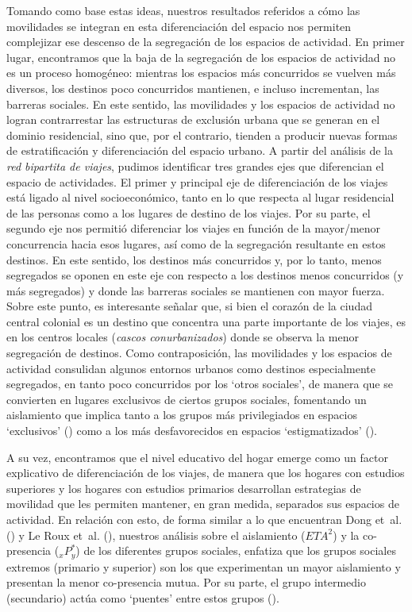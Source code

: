 \documentclass[
  spanish,
  a4paper,%
  chapterprefix=true,%
  DIV=calc,%
  twoside]{scrbook}%
\begin{document}
Tomando como base estas ideas, nuestros resultados referidos a cómo las
movilidades se integran en esta diferenciación del espacio nos permiten
complejizar ese descenso de la segregación de los espacios de actividad.
En primer lugar, encontramos que la baja de la segregación de los
espacios de actividad no es un proceso homogéneo: mientras los espacios
más concurridos se vuelven más diversos, los destinos poco concurridos
mantienen, e incluso incrementan, las barreras sociales. En este
sentido, las movilidades y los espacios de actividad no logran
contrarrestar las estructuras de exclusión urbana que se generan en el
dominio residencial, sino que, por el contrario, tienden a producir
nuevas formas de estratificación y diferenciación del espacio urbano. A
partir del análisis de la \emph{red bipartita de viajes}, pudimos identificar
tres grandes ejes que diferencian el espacio de actividades. El primer y
principal eje de diferenciación de los viajes está ligado al nivel
socioeconómico, tanto en lo que respecta al lugar residencial de las
personas como a los lugares de destino de los viajes. Por su parte, el
segundo eje nos permitió diferenciar los viajes en función de la
mayor/menor concurrencia hacia esos lugares, así como de la segregación
resultante en estos destinos. En este sentido, los destinos más
concurridos y, por lo tanto, menos segregados se oponen en este eje con
respecto a los destinos menos concurridos (y más segregados) y donde las
barreras sociales se mantienen con mayor fuerza. Sobre este punto, es
interesante señalar que, si bien el corazón de la ciudad central
colonial es un destino que concentra una parte importante de los viajes,
es en los centros locales (\emph{cascos conurbanizados}) donde se observa la
menor segregación de destinos. Como contraposición, las movilidades y
los espacios de actividad consulidan algunos entornos urbanos como
destinos especialmente segregados, en tanto poco concurridos por los
`otros sociales', de manera que se convierten en lugares exclusivos de
ciertos grupos sociales, fomentando un aislamiento que implica tanto a
los grupos más privilegiados en espacios `exclusivos' () como
a los más desfavorecidos en espacios `estigmatizados' ().

A su vez, encontramos que el nivel educativo del hogar emerge como un
factor explicativo de diferenciación de los viajes, de manera que los
hogares con estudios superiores y los hogares con estudios primarios
desarrollan estrategias de movilidad que les permiten mantener, en gran
medida, separados sus espacios de actividad. En relación con esto, de
forma similar a lo que encuentran Dong et~al. () y Le Roux et~al. (), nuestros
análisis sobre el aislamiento (\(ETA^2\)) y la co-presencia (\(_xP_y^*\)) de
los diferentes grupos sociales, enfatiza que los grupos sociales
extremos (primario y superior) son los que experimentan un mayor
aislamiento y presentan la menor co-presencia mutua. Por su parte, el
grupo intermedio (secundario) actúa como `puentes' entre estos grupos
().
\end{document}

